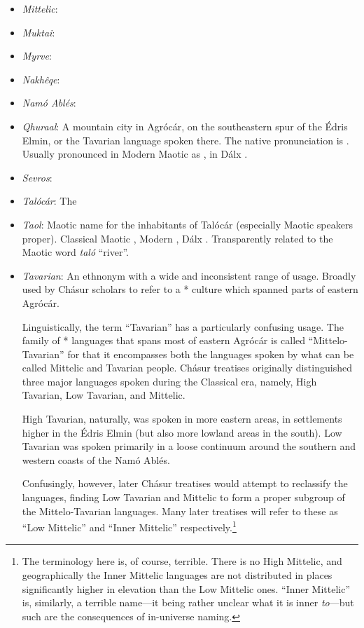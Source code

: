 \documentclass{article}
\begin{document}
\begin{itemize}
 \item \textit{Mittelic}:

 \item \textit{Muktai}:

 \item \textit{Myrve}:

 \item \textit{Nakhêqe}:

 \item \textit{Namó Ablés}:

 \item \textit{Qhuraal}: A mountain city in Agrócár, on the southeastern spur of the Édris Elmin, or the Tavarian language spoken there. The native pronunciation is . Usually pronounced in Modern Maotic as , in Dálx .

 \item \textit{Sevros}:

 \item \textit{Talócár}: The

 \item \textit{Taol}: Maotic name for the inhabitants of Talócár (especially Maotic speakers proper). Classical Maotic , Modern , Dálx . Transparently related to the Maotic word \textit{taló} ``river''.

 \item \textit{Tavarian}: An ethnonym with a wide and inconsistent range of usage. Broadly used by Chásur scholars to refer to a * culture which spanned parts of eastern Agrócár.

 Linguistically, the term ``Tavarian'' has a particularly confusing usage. The family of * languages that spans most of eastern Agrócár is called ``Mittelo-Tavarian'' for that it encompasses both the languages spoken by what can be called Mittelic and Tavarian people. Chásur treatises originally distinguished three major languages spoken during the Classical era, namely, High Tavarian, Low Tavarian, and Mittelic.

 High Tavarian, naturally, was spoken in more eastern areas, in settlements higher in the Édris Elmin (but also more lowland areas in the south). Low Tavarian was spoken primarily in a loose continuum around the southern and western coasts of the Namó Ablés.

 Confusingly, however, later Chásur treatises would attempt to reclassify the languages, finding Low Tavarian and Mittelic to form a proper subgroup of the Mittelo-Tavarian languages. Many later treatises will refer to these as ``Low Mittelic'' and ``Inner Mittelic'' respectively.\footnote{The terminology here is, of course, terrible. There is no High Mittelic, and geographically the Inner Mittelic languages are not distributed in places significantly higher in elevation than the Low Mittelic ones. ``Inner Mittelic'' is, similarly, a terrible name—it being rather unclear what it is inner \emph{to}—but such are the consequences of in-universe naming.}


\end{itemize}
\end{document}
